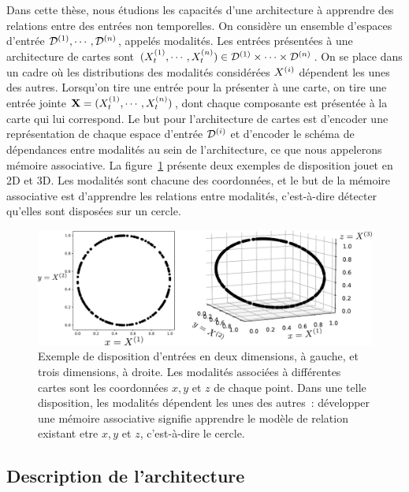 \documentclass[../main]{subfiles}
\begin{document}
Dans cette thèse, nous étudions les capacités d'une architecture à apprendre des relations entre des entrées non temporelles. 
On considère un ensemble d'espaces d'entrée $\mathcal{D}^{({1})}, \cdots , \mathcal{D}^{({n})}$, appelés modalités.
Les entrées présentées à une architecture de cartes sont $(X^{({1})}_t, \cdots, X^{({n})}_t) \in \mathcal{D}^{({1})} \times \cdots \times \mathcal{D}^{({n})}$. 
On se place dans un cadre où les distributions des modalités considérées $X^{({i})}$ dépendent les unes des autres.
Lorsqu'on tire une entrée pour la présenter à une carte, on tire une entrée jointe $\mathbf{X} =  (X^{({1})}_t, \cdots , X^{({n})}_t)$, dont chaque composante est présentée à la carte qui lui correspond. 
Le but pour l'architecture de cartes est d'encoder une représentation de chaque espace d'entrée $\mathcal{D}^{({i})}$ et d'encoder le schéma de dépendances entre modalités au sein de l'architecture, ce que nous appelerons mémoire associative.
La figure~\ref{fig:input_3som} présente deux exemples de disposition jouet en 2D et 3D. Les modalités sont chacune des coordonnées, et le but de la mémoire associative est d'apprendre les relations entre modalités, c'est-à-dire détecter qu'elles sont disposées sur un cercle.

\begin{figure}
\centering
\includegraphics[width=\textwidth]{inputs_3som}
\caption{Exemple de disposition d'entrées en deux dimensions, à gauche, et trois dimensions, à droite. Les modalités associées à différentes cartes sont les coordonnées $x,y$ et $z$ de chaque point. Dans une telle disposition, les modalités dépendent les unes des autres~: développer une mémoire associative signifie apprendre le modèle de relation existant etre $x,y$ et $z$, c'est-à-dire le cercle.\label{fig:input_3som}}
\end{figure}

\subsection{Description de l'architecture}
\end{document}

